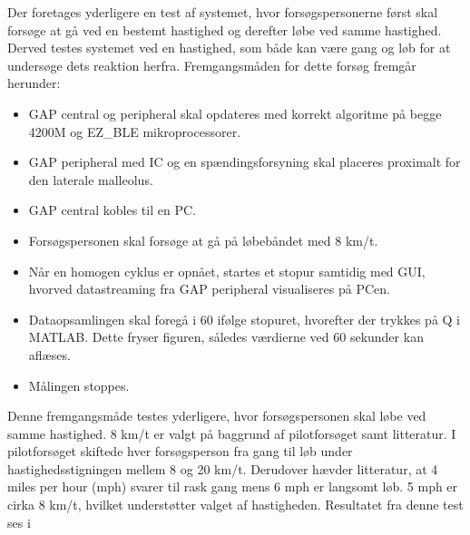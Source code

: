 Der foretages yderligere en test af systemet, hvor forsøgspersonerne først skal forsøge at gå ved en bestemt hastighed og derefter løbe ved samme hastighed. Derved testes systemet ved en hastighed, som både kan være gang og løb for at undersøge dets reaktion herfra. Fremgangsmåden for dette forsøg fremgår herunder:
\begin{itemize}
	\item GAP central og peripheral skal opdateres med korrekt algoritme på begge 4200M og EZ\_BLE mikroprocessorer.
	\item GAP peripheral med IC og en spændingsforsyning skal placeres proximalt for den laterale malleolus.
	\item GAP central kobles til en PC. 
	\item Forsøgspersonen skal forsøge at gå på løbebåndet med 8 km/t. 
	\item Når en homogen cyklus er opnået, startes et stopur samtidig med GUI, hvorved datastreaming fra GAP peripheral visualiseres på PCen.
	\item Dataopsamlingen skal foregå i 60 ifølge stopuret, hvorefter der trykkes på Q i MATLAB. Dette fryser figuren, således værdierne ved 60 sekunder kan aflæses.
	\item Målingen stoppes.
\end{itemize}
Denne fremgangsmåde testes yderligere, hvor forsøgspersonen skal løbe ved samme hastighed. 8 km/t er valgt på baggrund af pilotforsøget samt litteratur. I pilotforsøget skiftede hver forsøgsperson fra gang til løb under hastighedsstigningen mellem 8 og 20 km/t. Derudover hævder litteratur, at 4 miles per hour (mph) svarer til rask gang mens 6 mph er langsomt løb. 5 mph er cirka 8 km/t, hvilket understøtter valget af hastigheden. \citep{Miles2007} Resultatet fra denne test ses i 
